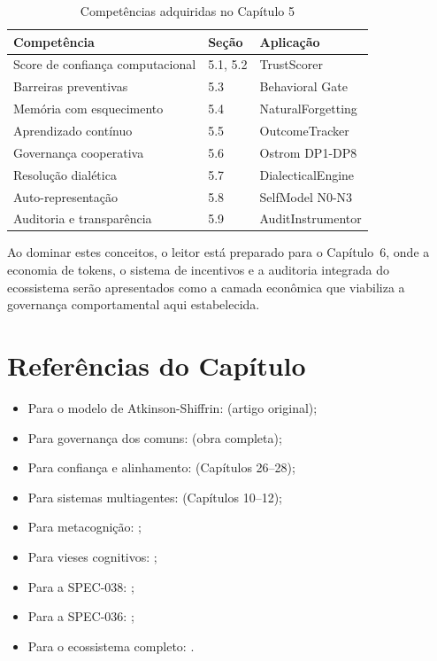 \begin{table}[htb]
\centering
\caption{Competências adquiridas no Capítulo 5}
\label{tab:competencias-cap5}
\begin{tabular}{lll}
\toprule
\textbf{Competência} & \textbf{Seção} & \textbf{Aplicação} \\
\midrule
Score de confiança computacional & 5.1, 5.2 & TrustScorer \\
Barreiras preventivas & 5.3 & Behavioral Gate \\
Memória com esquecimento & 5.4 & NaturalForgetting \\
Aprendizado contínuo & 5.5 & OutcomeTracker \\
Governança cooperativa & 5.6 & Ostrom DP1-DP8 \\
Resolução dialética & 5.7 & DialecticalEngine \\
Auto-representação & 5.8 & SelfModel N0-N3 \\
Auditoria e transparência & 5.9 & AuditInstrumentor \\
\bottomrule
\end{tabular}
\end{table}

Ao dominar estes conceitos, o leitor está preparado para o
Capítulo~6, onde a economia de tokens, o sistema de incentivos e a
auditoria integrada do ecossistema serão apresentados como a camada
econômica que viabiliza a governança comportamental aqui estabelecida.

\section*{Referências do Capítulo}
\begin{itemize}
\item Para o modelo de Atkinson-Shiffrin: \cite{atkinson1968human}
(artigo original);
\item Para governança dos comuns: \cite{ostrom1990governing}
(obra completa);
\item Para confiança e alinhamento: \cite{russell2020inteligencia}
(Capítulos 26--28);
\item Para sistemas multiagentes: \cite{wooldridge2009multiagent}
(Capítulos 10--12);
\item Para metacognição: \cite{flavell1976metacognitive,
schraw2006metacognitive};
\item Para vieses cognitivos: \cite{kahneman2003perspective};
\item Para a SPEC-038: \cite{opencode2026spec038};
\item Para a SPEC-036: \cite{opencode2026spec036};
\item Para o ecossistema completo: \cite{opencode2026ecosystem}.
\end{itemize}

